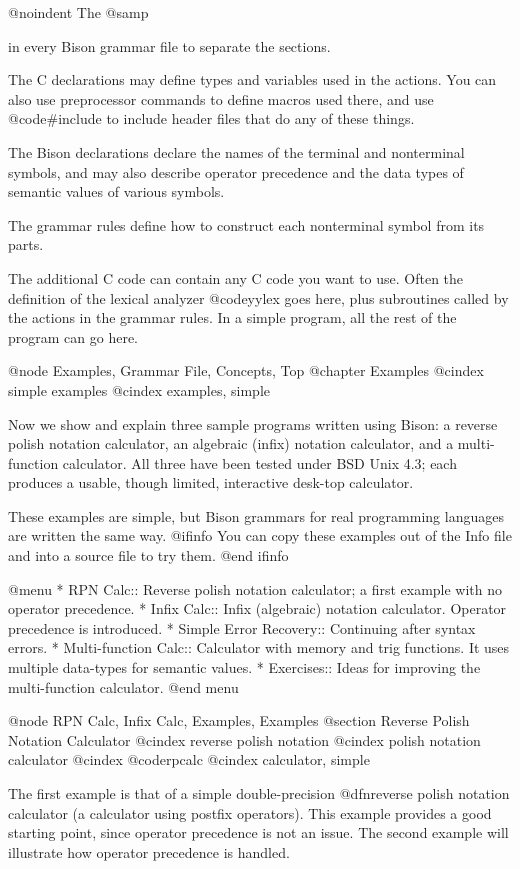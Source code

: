 @noindent
The @samp{%
in every Bison grammar file to separate the sections.

The C declarations may define types and variables used in the actions.
You can also use preprocessor commands to define macros used there, and use
@code{#include} to include header files that do any of these things.

The Bison declarations declare the names of the terminal and nonterminal
symbols, and may also describe operator precedence and the data types of
semantic values of various symbols.

The grammar rules define how to construct each nonterminal symbol from its
parts.

The additional C code can contain any C code you want to use.  Often the
definition of the lexical analyzer @code{yylex} goes here, plus subroutines
called by the actions in the grammar rules.  In a simple program, all the
rest of the program can go here.

@node Examples, Grammar File, Concepts, Top
@chapter Examples
@cindex simple examples
@cindex examples, simple 

Now we show and explain three sample programs written using Bison: a
reverse polish notation calculator, an algebraic (infix) notation
calculator, and a multi-function calculator.  All three have been tested
under BSD Unix 4.3; each produces a usable, though limited, interactive
desk-top calculator.

These examples are simple, but Bison grammars for real programming
languages are written the same way.
@ifinfo
You can copy these examples out of the Info file and into a source file
to try them.
@end ifinfo

@menu
* RPN Calc::               Reverse polish notation calculator;
			     a first example with no operator precedence.
* Infix Calc::		   Infix (algebraic) notation calculator.
			     Operator precedence is introduced.
* Simple Error Recovery::  Continuing after syntax errors.
* Multi-function Calc::    Calculator with memory and trig functions.
			     It uses multiple data-types for semantic values.
* Exercises::		   Ideas for improving the multi-function calculator.
@end menu

@node RPN Calc, Infix Calc, Examples, Examples
@section Reverse Polish Notation Calculator
@cindex reverse polish notation
@cindex polish notation calculator
@cindex @code{rpcalc}
@cindex calculator, simple

The first example is that of a simple double-precision @dfn{reverse polish
notation} calculator (a calculator using postfix operators).  This example
provides a good starting point, since operator precedence is not an issue.
The second example will illustrate how operator precedence is handled.

}
